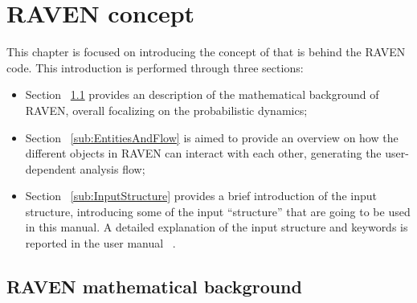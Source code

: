 \section{RAVEN concept}
\label{sec:RAVENconcept}
This chapter is focused on introducing the concept of that is behind the RAVEN code. This introduction
is performed through three sections:
\begin{itemize}
    \item Section ~\ref{sub:mathBackground} provides an description of the mathematical background of RAVEN, 
     overall focalizing on the probabilistic dynamics;
    \item Section ~\ref{sub:EntitiesAndFlow} is aimed to provide an overview on how the different objects in
    RAVEN can interact with each other, generating the user-dependent analysis flow;
    \item Section ~\ref{sub:InputStructure} provides a brief introduction of the input structure, introducing
    some of the input ``structure'' that are going to be used in this manual. A detailed explanation of the
    input structure and keywords is reported in the user manual ~\cite{RAVENuserManual}.
\end{itemize}
\subsection{RAVEN mathematical background}
\label{sub:mathBackground}
